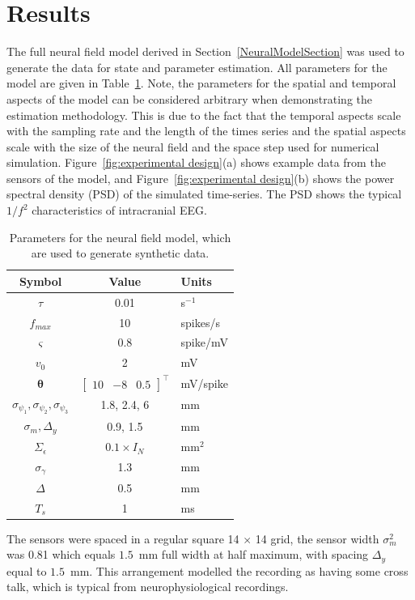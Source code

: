 \documentclass[10pt,a4paper]{article}
\begin{document}
\section{Results}\label{ResultsSection} The full neural field model derived in Section~\ref{NeuralModelSection} was used to generate the data for state and parameter estimation. All parameters for the model are given in Table~\ref{tab:Model Parameters}. Note, the parameters for the spatial and temporal aspects of the model can be considered arbitrary when demonstrating the estimation methodology. This is due to the fact that the temporal aspects scale with the sampling rate and the length of the times series and the spatial aspects scale with the size of the neural field and the space step used for numerical simulation. Figure~\ref{fig:experimental design}(a) shows example data from the sensors of the model, and Figure~\ref{fig:experimental design}(b) shows the power spectral density (PSD) of the simulated time-series. The PSD shows the typical $1/f^2$ characteristics of intracranial EEG.
\begin{table}\footnotesize
\centering
\begin{tabular}{ccl}
	\hline\hline Symbol & Value & Units \\
	\hline\hline
	$\tau$ & 0.01 & s$^{-1}$\\
	$f_{max}$ & 10 & spikes/s \\
	$\varsigma$ & 0.8 & spike/mV\\
	$v_0$ & 2 & mV\\
	$\boldsymbol{\theta}$ & $\left[\begin{array}{ccc}
	10 &-8 &0.5
	\end{array}
	\right]^{\top}$ & mV/spike\\
	$\sigma_{\psi_{1}}, \sigma_{\psi_{2}}, \sigma_{\psi_{3}}$ & 1.8, 2.4, 6 & mm\\
	$\sigma_{m},\Delta_{y}$&0.9, 1.5&mm\\
	$\Sigma_{\epsilon}$ &$0.1 \times I_{N} $& mm$^2$ \\
	$\sigma_{\gamma}$&1.3&mm\\
	$\Delta$ & 0.5 & mm \\
	$T_s$ & 1 & ms \\ 
\end{tabular}
\caption{Parameters for the neural field model, which are used to generate synthetic data.}
\label{tab:Model Parameters}
\end{table}
The sensors were spaced in a regular square 14 $\times$ 14 grid, the sensor width $\sigma^2_m$ was 0.81 which equals $1.5$~mm full width at half maximum, with spacing $\Delta_y$ equal to $1.5$~mm. This arrangement modelled the recording as having some cross talk, which is typical from neurophysiological recordings. 
\end{document}
